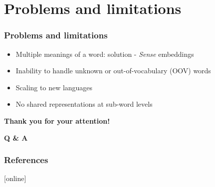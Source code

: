 
\section{Problems and limitations}


\begin{frame}
\frametitle{Problems and limitations}

	\begin{itemize}
		\item Multiple meanings of a word: solution - \textit{Sense} embeddings
		\item Inability to handle unknown or out-of-vocabulary (OOV) words
		\item Scaling to new languages
		\item No shared representations at sub-word levels
	\end{itemize}

\end{frame}

\begin{frame}

\begin{center}
	\Huge \textbf{Thank you for your attention!}
\end{center}

\end{frame}

\begin{frame}

\begin{center}
\Huge \textbf{Q \& A}
\end{center}

\end{frame}

\begin{frame}[allowframebreaks]
\frametitle{References}
%

\nocite{*}
[online]

\end{frame}

